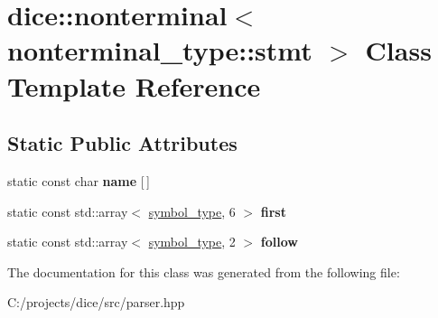 \hypertarget{classdice_1_1nonterminal_3_01nonterminal__type_1_1stmt_01_4}{}\section{dice\+:\+:nonterminal$<$ nonterminal\+\_\+type\+:\+:stmt $>$ Class Template Reference}
\label{classdice_1_1nonterminal_3_01nonterminal__type_1_1stmt_01_4}
\subsection*{Static Public Attributes}
\begin{DoxyCompactItemize}
\item 
\mbox{\label{classdice_1_1nonterminal_3_01nonterminal__type_1_1stmt_01_4_ae91b9e3364c1b4bc7cd52f7e91d40bd6}} 
static const char {\bfseries name} \mbox{[}$\,$\mbox{]}
\item 
\mbox{\label{classdice_1_1nonterminal_3_01nonterminal__type_1_1stmt_01_4_a9c3ac7c54b8cc103ccf86a43dbbee66d}} 
static const std\+::array$<$ \mbox{\hyperlink{symbols_8hpp_ab0295a855bb7eadc138abd6993af3aea}{symbol\+\_\+type}}, 6 $>$ {\bfseries first}
\item 
\mbox{\label{classdice_1_1nonterminal_3_01nonterminal__type_1_1stmt_01_4_ae9618f437a5b6528d0f8c3f1ca2951b7}} 
static const std\+::array$<$ \mbox{\hyperlink{symbols_8hpp_ab0295a855bb7eadc138abd6993af3aea}{symbol\+\_\+type}}, 2 $>$ {\bfseries follow}
\end{DoxyCompactItemize}


The documentation for this class was generated from the following file\+:\begin{DoxyCompactItemize}
\item 
C\+:/projects/dice/src/parser.\+hpp\end{DoxyCompactItemize}
